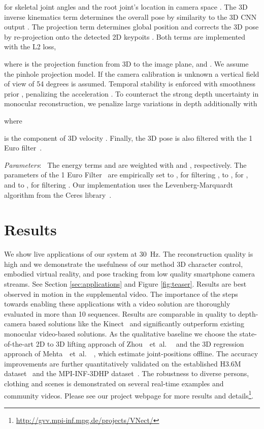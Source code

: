 \documentclass[acmtog]{acmart}
\newcommand{\parahead}[1]{\vspace{5pt}\noindent\emph{#1}:\ }
\newcommand{\etal}{~et~al.\ }
\newcommand{\change}[1]{{#1}}
\newcommand{\FPS}{30}
\begin{document}
for skeletal joint angles  and the root joint's location in camera space . 
The 3D inverse kinematics term  determines the overall pose by similarity to the 3D CNN output .
The projection term  determines global position  and corrects the 3D pose by re-projection onto the detected 2D keypoits . 
Both terms are implemented with the L2 loss,

where  is the projection function from 3D to the image plane, and . We assume the pinhole projection model. If the camera calibration is unknown a vertical field of view of 54 degrees is assumed. 
Temporal stability is enforced with smoothness prior , penalizing the acceleration . To counteract the strong depth uncertainty in monocular reconstruction, we penalize large variations in depth additionally with

where 

is the  component of 3D velocity 
.
Finally, the 3D pose is also filtered with the 1 Euro filter~\cite{casiez_1euro_sigchi12}.
 
\parahead{Parameters}
The energy terms  and  are weighted with  and , respectively.
The parameters of the 1 Euro Filter~\cite{casiez_1euro_sigchi12} are empirically set to ,  for filtering , 
to ,  for , 
and to ,  for filtering .
\change{Our implementation uses the Levenberg-Marquardt algorithm from the 	Ceres library~\cite{ceres-solver}.}

\section{Results}
\label{sec:results}
We show live applications of our system at \FPS~Hz.
The reconstruction quality is high \change{and we demonstrate the usefulness of our method 3D character control, embodied virtual reality, and pose tracking from low quality smartphone camera streams}.
See Section \ref{sec:applications} and Figure \ref{fig:teaser}.
Results are best observed in motion in the supplemental video.
The importance of the steps towards enabling these applications with a video solution
are thoroughly \change{evaluated in more than 10 sequences.}
Results are \change{comparable} in quality to depth-camera based \change{solutions like} the Kinect~\cite{kinectv2}
and significantly outperform existing monocular video-based solutions. 
As the qualitative baseline we choose the state-of-the-art 2D to 3D lifting approach of Zhou~\etal~ and the 3D regression approach of Mehta~\etal~, which estimate joint-positions offline.
The accuracy improvements are further quantitatively validated on the established H3.6M dataset~\cite{ionescu_human36_pami14} and the MPI-INF-3DHP dataset~\cite{mehta_mlc3d_arxiv16}.
The robustness to diverse persons, clothing and scenes is demonstrated on several \change{real-time examples and community} videos.
Please see our project webpage for more results and details\footnote{\normalsize \url{http://gvv.mpi-inf.mpg.de/projects/VNect/}}.
\end{document}

